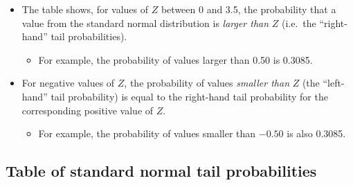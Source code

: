 \documentclass[11pt,a4paper,openany]{book}
\providecommand{\tightlist}{%
  \setlength{\itemsep}{0pt}\setlength{\parskip}{0pt}}
\begin{document}
\begin{itemize}
\item
  The table shows, for values of \(Z\) between 0 and 3.5, the
  probability that a value from the standard normal distribution is
  \emph{larger than} \(Z\) (i.e.~the ``right-hand'' tail probabilities).

  \begin{itemize}
  \tightlist
  \item
    For example, the probability of values larger than 0.50 is 0.3085.
  \end{itemize}
\item
  For negative values of \(Z\), the probability of values \emph{smaller
  than} \(Z\) (the ``left-hand'' tail probability) is equal to the
  right-hand tail probability for the corresponding positive value of
  \(Z\).

  \begin{itemize}
  \tightlist
  \item
    For example, the probability of values smaller than \(-0.50\) is
    also 0.3085.
  \end{itemize}
\end{itemize}

\newpage

\subsection{Table of standard normal tail
probabilities}\label{s-disttables-Z}

\small
\end{document}
